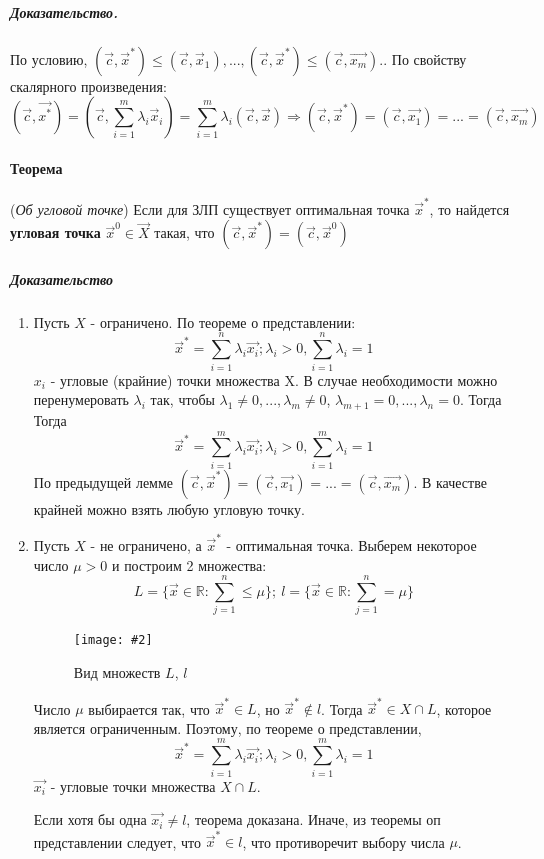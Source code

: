 \documentclass[a4paper, 14pt]{extarticle}
\newcommand{\screenshot}[3]{
	\begin{figure}[h]
		\centering
		\texttt{[image: \#2]}
		\caption{#3}
	\end{figure}
}
\numberwithin{equation}{section}
\begin{document}
\subparagraph{Доказательство.} По условию,
$(\vec{c}, \vec{x}^*) \le (\vec{c}, \vec{x}_1), ..., (\vec{c}, \vec{x}^*) \le (\vec{c}, \vec{x_m}).$. По свойству скалярного произведения: 
\[
(\vec{c}, \vec{x^*}) = (\vec{c}, \sum_{i=1}^{m} \lambda_i \vec{x}_i) = \sum_{i=1}^{m} \lambda_i (\vec{c}, \vec{x}) \Rightarrow (\vec{c}, \vec{x}^*) = (\vec{c}, \vec{x_1}) = ... = (\vec{c}, \vec{x_m})
\]

\paragraph{Теорема} (\textit{Об угловой точке}) Если для ЗЛП существует оптимальная точка $\vec{x}^*$, то найдется \textbf{угловая точка} $\vec{x}^0 \in \vec{X}$ такая, что $(\vec{c}, \vec{x}^*) = (\vec{c}, \vec{x}^0)$

\subparagraph{Доказательство}
\begin{enumerate}
	\item Пусть $X$ - ограничено. По теореме о представлении:
	\[
		\vec{x}^* = \sum_{i=1}^n \lambda_i \vec{x_i}; \lambda_i > 0, \sum\limits_{i=1}^n \lambda_i = 1
	\]
	$x_i$ - угловые (крайние) точки множества X.
	В случае необходимости можно перенумеровать $\lambda_i$ так, чтобы $\lambda_1 \ne 0, ..., \lambda_m \ne 0$, $\lambda_{m+1} = 0, ..., \lambda_n = 0$. Тогда 
	Тогда 
	\[
		\vec{x}^* = \sum_{i=1}^m \lambda_i \vec{x_i}; \lambda_i > 0, \sum\limits_{i=1}^m \lambda_i = 1
	\]
	По предыдущей лемме $(\vec{c}, \vec{x}^*) = (\vec{c}, \vec{x_1}) = ... = (\vec{c}, \vec{x_m})$. В качестве крайней можно взять любую угловую точку. 
	\item Пусть $X$ - не ограничено, а $\vec{x}^*$ - оптимальная точка. Выберем некоторое число $ \mu > 0 $ и построим 2 множества:
	\[
		L = \{ \vec{x} \in \mathbb{R}: \sum_{j=1}^{n} \le \mu \}; \ 
		l = \{ \vec{x} \in \mathbb{R}: \sum_{j=1}^{n} = \mu \}
	\]
	\screenshot{width=7cm}{img/S005.jpg}{Вид множеств $L$, $l$}
	
	Число $\mu$ выбирается так, что $\vec{x}^* \in L$, но $\vec{x}^* \notin l$. Тогда $\vec{x}^* \in X \cap L$, которое является ограниченным. Поэтому, по теореме о представлении,
	\[
	\vec{x}^* = \sum_{i=1}^m \lambda_i \vec{x_i}; \lambda_i > 0, \sum\limits_{i=1}^m \lambda_i = 1
	\]
	$\vec{x_i}$ - угловые точки множества $X \cap L$. 
	
	Если хотя бы одна $\vec{x_i} \ne l$, теорема доказана. Иначе, из теоремы оп представлении следует, что $\vec{x}^* \in l$, что противоречит выбору числа $\mu$.
\end{enumerate}
\end{document}
